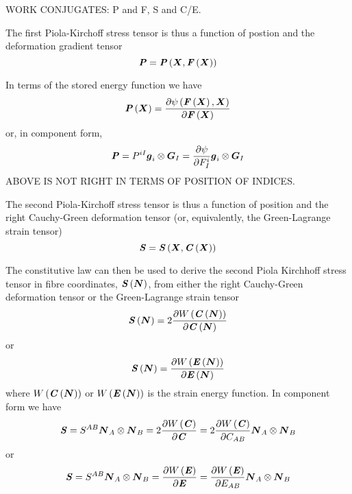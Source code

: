 WORK CONJUGATES: P and F, S and C/E.

The first Piola-Kirchoff stress tensor is thus a function of postion and the
deformation gradient tensor \ie
\begin{equation}
  \boldsymbol{\mathit{P}}= \boldsymbol{\mathit{P}}\left(  \boldsymbol{X} , \boldsymbol{\mathit{F}}\left(  \boldsymbol{X}  \right)  \right) 
\end{equation}

In terms of the stored energy function we have
\begin{equation}
   \boldsymbol{\mathit{P}}\left(  \boldsymbol{X}  \right) = \dfrac{\partial  \psi\left(  \boldsymbol{\mathit{F}}\left(  \boldsymbol{X}  \right) , \boldsymbol{X}  \right) }{\partial  \boldsymbol{\mathit{F}}\left(  \boldsymbol{X}  \right) } 
\end{equation}
or, in component form,
\begin{equation}
  \boldsymbol{\mathit{P}}=P^{iI}  \boldsymbol{g} _{i} \otimes  \boldsymbol{G} _{I} = \dfrac{\partial \psi}{\partial F^{i}_{I}}   \boldsymbol{g} _{i} \otimes  \boldsymbol{G} _{I} 
\end{equation}
ABOVE IS NOT RIGHT IN TERMS OF POSITION OF INDICES.

The second Piola-Kirchoff stress tensor is thus a function of position and
the right Cauchy-Green deformation tensor (or, equivalently, the
Green-Lagrange strain tensor) \ie
\begin{equation}
  \boldsymbol{\mathit{S}}= \boldsymbol{\mathit{S}}\left(  \boldsymbol{X} , \boldsymbol{\mathit{C}}\left(  \boldsymbol{X}  \right)  \right) 
\end{equation}


The constitutive law can then be used to derive the second Piola Kirchhoff
stress tensor in fibre coordinates, $ \boldsymbol{\mathit{S}}\left(  \boldsymbol{N}  \right) $, from
either the right Cauchy-Green deformation tensor or the Green-Lagrange strain
tensor \ie
\begin{equation}
   \boldsymbol{\mathit{S}}\left(  \boldsymbol{N}  \right) =2 \dfrac{\partial  W\left(  \boldsymbol{\mathit{C}}\left(  \boldsymbol{N}  \right)  \right) }{\partial  \boldsymbol{\mathit{C}}\left(  \boldsymbol{N}  \right) } 
\end{equation}
or
\begin{equation}
   \boldsymbol{\mathit{S}}\left(  \boldsymbol{N}  \right) = \dfrac{\partial  W\left(  \boldsymbol{\mathit{E}}\left(  \boldsymbol{N}  \right)  \right) }{\partial  \boldsymbol{\mathit{E}}\left(  \boldsymbol{N}  \right) } 
\end{equation}
where $ W\left(  \boldsymbol{\mathit{C}}\left(  \boldsymbol{N}  \right)  \right) $ or
$ W\left(  \boldsymbol{\mathit{E}}\left(  \boldsymbol{N}  \right)  \right) $ is the strain energy
function. In component form we have
\begin{equation}
  \boldsymbol{\mathit{S}}=S^{AB}  \boldsymbol{N} _{A} \otimes  \boldsymbol{N} _{B} =2 \dfrac{\partial  W\left( \boldsymbol{\mathit{C}} \right) }{\partial \boldsymbol{\mathit{C}}} =2 \dfrac{\partial  W\left( \boldsymbol{\mathit{C}} \right) }{\partial C_{AB}}   \boldsymbol{N} _{A} \otimes  \boldsymbol{N} _{B} 
\end{equation}
or
\begin{equation}
  \boldsymbol{\mathit{S}}=S^{AB}  \boldsymbol{N} _{A} \otimes  \boldsymbol{N} _{B} = \dfrac{\partial  W\left( \boldsymbol{\mathit{E}} \right) }{\partial \boldsymbol{\mathit{E}}} = \dfrac{\partial  W\left( \boldsymbol{\mathit{E}} \right) }{\partial E_{AB}}   \boldsymbol{N} _{A} \otimes  \boldsymbol{N} _{B} 
\end{equation}

